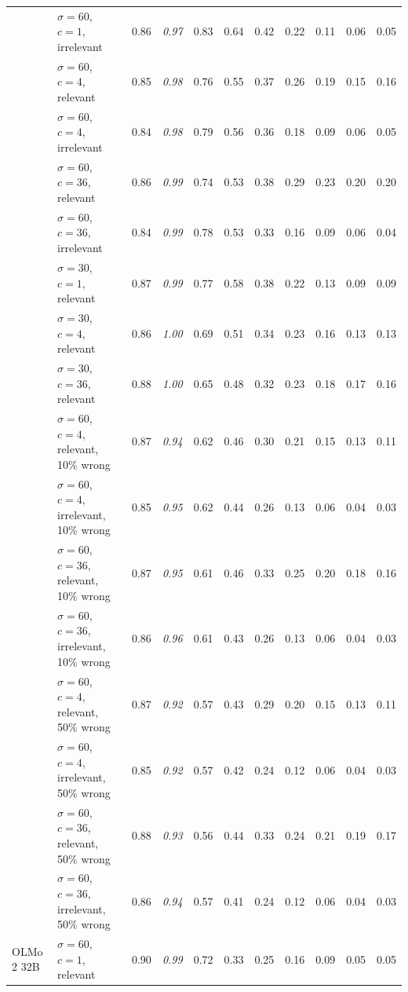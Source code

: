 \begin{tabular}{llrrrrrrrrr}
 & $\sigma = 60$, $c = 1$, irrelevant & 0.86 & \textit{0.97} & 0.83 & 0.64 & 0.42 & 0.22 & 0.11 & 0.06 & 0.05 \\
 & $\sigma = 60$, $c = 4$, relevant & 0.85 & \textit{0.98} & 0.76 & 0.55 & 0.37 & 0.26 & 0.19 & 0.15 & 0.16 \\
 & $\sigma = 60$, $c = 4$, irrelevant & 0.84 & \textit{0.98} & 0.79 & 0.56 & 0.36 & 0.18 & 0.09 & 0.06 & 0.05 \\
 & $\sigma = 60$, $c = 36$, relevant & 0.86 & \textit{0.99} & 0.74 & 0.53 & 0.38 & 0.29 & 0.23 & 0.20 & 0.20 \\
 & $\sigma = 60$, $c = 36$, irrelevant & 0.84 & \textit{0.99} & 0.78 & 0.53 & 0.33 & 0.16 & 0.09 & 0.06 & 0.04 \\
 & $\sigma = 30$, $c = 1$, relevant & 0.87 & \textit{0.99} & 0.77 & 0.58 & 0.38 & 0.22 & 0.13 & 0.09 & 0.09 \\
 & $\sigma = 30$, $c = 4$, relevant & 0.86 & \textit{1.00} & 0.69 & 0.51 & 0.34 & 0.23 & 0.16 & 0.13 & 0.13 \\
 & $\sigma = 30$, $c = 36$, relevant & 0.88 & \textit{1.00} & 0.65 & 0.48 & 0.32 & 0.23 & 0.18 & 0.17 & 0.16 \\
 & $\sigma = 60$, $c = 4$, relevant, 10\% wrong & 0.87 & \textit{0.94} & 0.62 & 0.46 & 0.30 & 0.21 & 0.15 & 0.13 & 0.11 \\
 & $\sigma = 60$, $c = 4$, irrelevant, 10\% wrong & 0.85 & \textit{0.95} & 0.62 & 0.44 & 0.26 & 0.13 & 0.06 & 0.04 & 0.03 \\
 & $\sigma = 60$, $c = 36$, relevant, 10\% wrong & 0.87 & \textit{0.95} & 0.61 & 0.46 & 0.33 & 0.25 & 0.20 & 0.18 & 0.16 \\
 & $\sigma = 60$, $c = 36$, irrelevant, 10\% wrong & 0.86 & \textit{0.96} & 0.61 & 0.43 & 0.26 & 0.13 & 0.06 & 0.04 & 0.03 \\
 & $\sigma = 60$, $c = 4$, relevant, 50\% wrong & 0.87 & \textit{0.92} & 0.57 & 0.43 & 0.29 & 0.20 & 0.15 & 0.13 & 0.11 \\
 & $\sigma = 60$, $c = 4$, irrelevant, 50\% wrong & 0.85 & \textit{0.92} & 0.57 & 0.42 & 0.24 & 0.12 & 0.06 & 0.04 & 0.03 \\
 & $\sigma = 60$, $c = 36$, relevant, 50\% wrong & 0.88 & \textit{0.93} & 0.56 & 0.44 & 0.33 & 0.24 & 0.21 & 0.19 & 0.17 \\
 & $\sigma = 60$, $c = 36$, irrelevant, 50\% wrong & 0.86 & \textit{0.94} & 0.57 & 0.41 & 0.24 & 0.12 & 0.06 & 0.04 & 0.03 \\
\midrule
OLMo 2 32B & $\sigma = 60$, $c = 1$, relevant & 0.90 & \textit{0.99} & 0.72 & 0.33 & 0.25 & 0.16 & 0.09 & 0.05 & 0.05 \\

\end{tabular}
